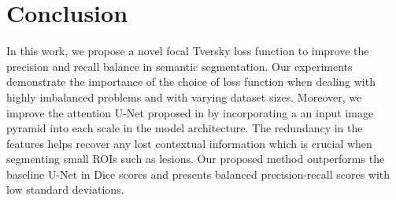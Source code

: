 \documentclass{article}
\begin{document}
\section{Conclusion}

In this work, we propose a novel focal Tversky loss function to improve the precision and recall balance in semantic segmentation. Our experiments demonstrate the importance of the choice of loss function when dealing with highly imbalanced problems and with varying dataset sizes. Moreover, we improve the attention U-Net proposed in \cite{oktay} by incorporating a an input image pyramid into each scale in the model architecture. The redundancy in the features helps recover any lost contextual information which is crucial when segmenting small ROIs such as lesions. Our proposed method outperforms the baseline U-Net in Dice scores and presents balanced precision-recall scores with low standard deviations.
\vfill
\pagebreak


\label{sec:ref}
\newpage


\end{document}
